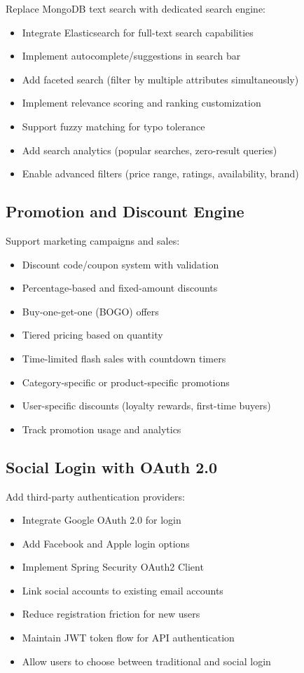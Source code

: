 Replace MongoDB text search with dedicated search engine:
\begin{itemize}
    \item Integrate Elasticsearch for full-text search capabilities
    \item Implement autocomplete/suggestions in search bar
    \item Add faceted search (filter by multiple attributes simultaneously)
    \item Implement relevance scoring and ranking customization
    \item Support fuzzy matching for typo tolerance
    \item Add search analytics (popular searches, zero-result queries)
    \item Enable advanced filters (price range, ratings, availability, brand)
\end{itemize}

\subsection{Promotion and Discount Engine}

Support marketing campaigns and sales:
\begin{itemize}
    \item Discount code/coupon system with validation
    \item Percentage-based and fixed-amount discounts
    \item Buy-one-get-one (BOGO) offers
    \item Tiered pricing based on quantity
    \item Time-limited flash sales with countdown timers
    \item Category-specific or product-specific promotions
    \item User-specific discounts (loyalty rewards, first-time buyers)
    \item Track promotion usage and analytics
\end{itemize}

\subsection{Social Login with OAuth 2.0}

Add third-party authentication providers:
\begin{itemize}
    \item Integrate Google OAuth 2.0 for login
    \item Add Facebook and Apple login options
    \item Implement Spring Security OAuth2 Client
    \item Link social accounts to existing email accounts
    \item Reduce registration friction for new users
    \item Maintain JWT token flow for API authentication
    \item Allow users to choose between traditional and social login
\end{itemize}

